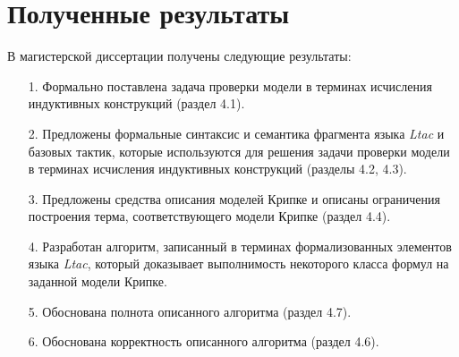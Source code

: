 \documentclass[12pt]{article}
\begin{document}
\section{Полученные результаты}
В магистерской диссертации получены следующие результаты:
\begin{enumerate}
    \item[1.] Формально поставлена задача проверки модели в терминах исчисления индуктивных конструкций (раздел 4.1).
    \item[2.] Предложены формальные синтаксис и семантика фрагмента языка \textit{Ltac} и базовых тактик, которые используются для решения задачи проверки модели в терминах исчисления индуктивных конструкций (разделы 4.2, 4.3).
    \item[3.] Предложены средства описания моделей Крипке и описаны ограничения построения терма, соответствующего модели Крипке (раздел 4.4).
    \item[4.] Разработан алгоритм, записанный в терминах формализованных элементов языка \textit{Ltac}, который доказывает выполнимость некоторого класса формул на заданной модели Крипке.
    \item[5.] Обоснована полнота описанного алгоритма (раздел 4.7).
    \item[6.] Обоснована корректность описанного алгоритма (раздел 4.6).
\end{enumerate}
\end{document}
